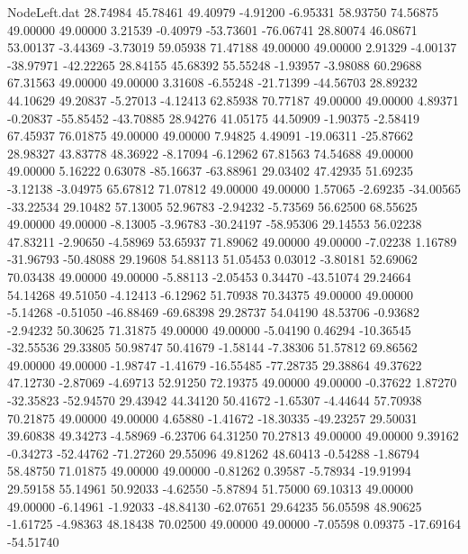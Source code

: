 \begin{filecontents}{NodeLeft.dat}
  28.74984   45.78461   49.40979    -4.91200   -6.95331   58.93750   74.56875   49.00000   49.00000    3.21539   -0.40979  -53.73601  -76.06741
  28.80074   46.08671   53.00137    -3.44369   -3.73019   59.05938   71.47188   49.00000   49.00000    2.91329   -4.00137  -38.97971  -42.22265
  28.84155   45.68392   55.55248    -1.93957   -3.98088   60.29688   67.31563   49.00000   49.00000    3.31608   -6.55248  -21.71399  -44.56703
  28.89232   44.10629   49.20837    -5.27013   -4.12413   62.85938   70.77187   49.00000   49.00000    4.89371   -0.20837  -55.85452  -43.70885
  28.94276   41.05175   44.50909    -1.90375   -2.58419   67.45937   76.01875   49.00000   49.00000    7.94825    4.49091  -19.06311  -25.87662
  28.98327   43.83778   48.36922    -8.17094   -6.12962   67.81563   74.54688   49.00000   49.00000    5.16222    0.63078  -85.16637  -63.88961
  29.03402   47.42935   51.69235    -3.12138   -3.04975   65.67812   71.07812   49.00000   49.00000    1.57065   -2.69235  -34.00565  -33.22534
  29.10482   57.13005   52.96783    -2.94232   -5.73569   56.62500   68.55625   49.00000   49.00000   -8.13005   -3.96783  -30.24197  -58.95306
  29.14553   56.02238   47.83211    -2.90650   -4.58969   53.65937   71.89062   49.00000   49.00000   -7.02238    1.16789  -31.96793  -50.48088
  29.19608   54.88113   51.05453     0.03012   -3.80181   52.69062   70.03438   49.00000   49.00000   -5.88113   -2.05453    0.34470  -43.51074
  29.24664   54.14268   49.51050    -4.12413   -6.12962   51.70938   70.34375   49.00000   49.00000   -5.14268   -0.51050  -46.88469  -69.68398
  29.28737   54.04190   48.53706    -0.93682   -2.94232   50.30625   71.31875   49.00000   49.00000   -5.04190    0.46294  -10.36545  -32.55536
  29.33805   50.98747   50.41679    -1.58144   -7.38306   51.57812   69.86562   49.00000   49.00000   -1.98747   -1.41679  -16.55485  -77.28735
  29.38864   49.37622   47.12730    -2.87069   -4.69713   52.91250   72.19375   49.00000   49.00000   -0.37622    1.87270  -32.35823  -52.94570
  29.43942   44.34120   50.41672    -1.65307   -4.44644   57.70938   70.21875   49.00000   49.00000    4.65880   -1.41672  -18.30335  -49.23257
  29.50031   39.60838   49.34273    -4.58969   -6.23706   64.31250   70.27813   49.00000   49.00000    9.39162   -0.34273  -52.44762  -71.27260
  29.55096   49.81262   48.60413    -0.54288   -1.86794   58.48750   71.01875   49.00000   49.00000   -0.81262    0.39587   -5.78934  -19.91994
  29.59158   55.14961   50.92033    -4.62550   -5.87894   51.75000   69.10313   49.00000   49.00000   -6.14961   -1.92033  -48.84130  -62.07651
  29.64235   56.05598   48.90625    -1.61725   -4.98363   48.18438   70.02500   49.00000   49.00000   -7.05598    0.09375  -17.69164  -54.51740

\end{filecontents}
